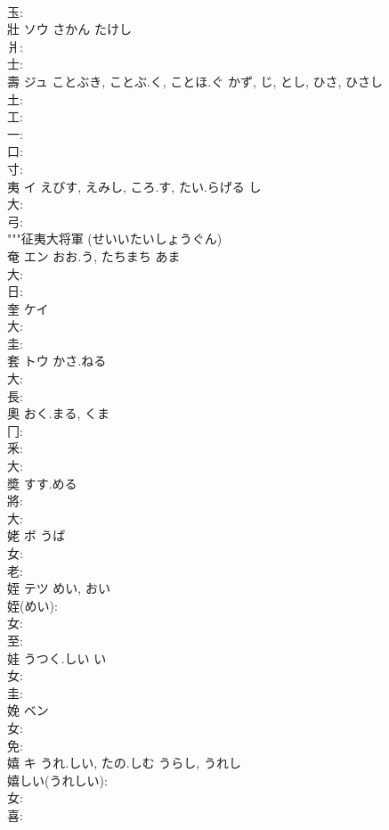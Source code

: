 \documentclass[8pt]{extreport}
\begin{document}
\begin{CJK}{UTF8}{min}
\\	玉: 
\\	壯	ソウ	さかん	たけし			
\\	爿: 
\\	士: 
\\	壽	ジュ	ことぶき, ことぶ.く, ことほ.ぐ	かず, じ, とし, ひさ, ひさし	
\\	土: 
\\	工: 
\\	一: 
\\	口: 
\\	寸: 
\\	夷	イ	えびす, えみし, ころ.す, たい.らげる	し	
\\	大: 
\\	弓: 
\\	"""征夷大将軍 (せいいたいしょうぐん) 
\\	奄	エン	おお.う, たちまち	あま	
\\	大: 
\\	日: 
\\	奎	ケイ			
\\	大: 
\\	圭: 
\\	套	トウ	かさ.ねる		
\\	大: 
\\	長: 
\\	奧		おく.まる, くま				
\\	冂: 
\\	釆: 
\\	大: 
\\	奬		すす.める				
\\	將: 
\\	大: 
\\	姥	ボ	うば		
\\	女: 
\\	老: 
\\	姪	テツ	めい, おい		
\\	姪(めい): 
\\	女: 
\\	至: 
\\	娃		うつく.しい	い			
\\	女: 
\\	圭: 
\\	娩	ベン			
\\	女: 
\\	免: 
\\	嬉	キ	うれ.しい, たの.しむ	うらし, うれし	
\\	嬉しい(うれしい): 
\\	女: 
\\	喜: 

\end{CJK}
\end{document}
